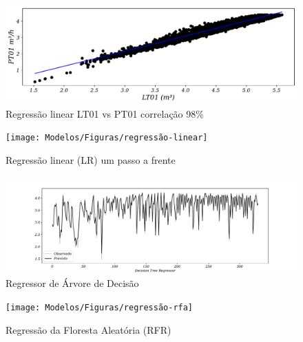 \begin{figure}[H]
	\centering
	\caption{Regressão linear LT01 vs PT01 correlação 98\%}
	\label{fig:lr-lt01-m3}
	\includegraphics[width=0.82\linewidth]{"Modelos/Figuras/LR LT01 (m³)"}
	

\end{figure}





\begin{figure}[H]
	\centering
	\caption{Regressão linear (LR) um passo a frente}
	\label{fig:1-regressao-linear}
	\texttt{[image: Modelos/Figuras/regressão-linear]}
	

\end{figure}




\begin{figure}[H]
	\centering
	\caption{Regressor de \'Arvore de Decis\~ao }\label{fig:decision-tree-regressor}
	\includegraphics[width=1\linewidth]{Apendices/Figuras/modelagem-24h/Decision-Tree-Regressor}
	

\end{figure}



\begin{figure}[H]
	\centering
	\caption{Regressão da Floresta Aleatória (RFR)}
	\label{fig:1-regressao-rfa}
	\texttt{[image: Modelos/Figuras/regressão-rfa]}
	

\end{figure}





